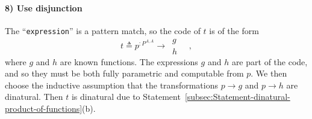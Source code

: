 \paragraph{8) Use disjunction}

The \textsf{``}\lstinline!expression!\textsf{''} is a pattern match, so the code
of $t$ is of the form 
\[
t\triangleq p^{:P^{A,A}}\rightarrow\,\begin{array}{||c|}
g\\
h
\end{array}\quad,
\]
where $g$ and $h$ are known functions. The expressions $g$ and
$h$ are part of the code, and so they must be both fully parametric
and computable from $p$. We then choose the inductive assumption
that the transformations $p\rightarrow g$ and $p\rightarrow h$ are
dinatural. Then $t$ is dinatural due to Statement~\ref{subsec:Statement-dinatural-product-of-functions}(b).

